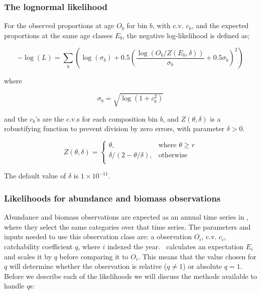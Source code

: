 \subsubsection*{The lognormal likelihood}

For the observed proportions at age $O_b$ for bin $b$, with c.v. $c_b$, and the expected proportions at the same age classes $E_b$, the negative log-likelihood is defined as;

\begin{equation}
- \log \left(L \right) = \sum\limits_b \left( \log \left( \sigma_b \right) + 0.5\left( \frac{\log \left(O_b / Z \left(E_b,\delta \right) \right)}{\sigma_b} + 0.5 \sigma_b \right)^2 \right)
\end{equation}

where

\begin{equation}
\sigma_b  = \sqrt{\log \left(1+c_b^2 \right)}
\end{equation}

and the $c_b$'s are the c.v.s for each composition bin $b$, and $Z \left(\theta,\delta \right)$ is a robustifying function to prevent division by zero errors, with parameter $\delta>0$.

\begin{equation}
Z \left(\theta,\delta \right) = \begin{cases}
\theta, & \text{where $\theta \ge r$} \\
\delta/\left( 2-\theta/\delta \right), & \text{otherwise} \\
\end{cases}
\end{equation}

The default value of $\delta$ is $1 \times 10^{-11}$.


\subsubsection{Likelihoods for abundance and biomass observations}\label{Obs:biomass}

Abundance and biomass observations are expected as an annual time series in \CNAME, where they select the same categories over that time series. The parameters and inputs needed to use this observation class are: a observation $O_i$, c.v. $c_i$, catchability coefficient $q$, where $i$ indexed the year. \CNAME\ calculates an expectation $E_i$ and scales it by $q$ before comparing it to $O_i$. This means that the value chosen for $q$ will determine whether the observation is relative ($q\neq 1$) or absolute $q = 1$. Before we describe each of the likelihoods we will discuss the methods available to handle $q$s:

